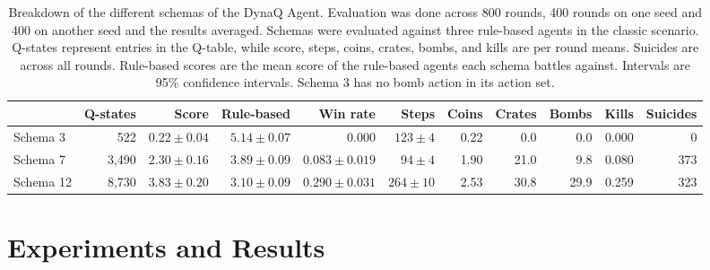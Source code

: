 \documentclass[article, 10pt]{IEEEtran}
\begin{document}
\begin{table}[t]
  \centering \small
  \caption{Breakdown of the different schemas of the DynaQ Agent. Evaluation was done across 800 rounds, 400 rounds on one seed and 400 on another seed and the results averaged. Schemas were evaluated against three rule-based agents in the classic scenario. Q-states represent entries in the Q-table, while score, steps, coins, crates, bombs, and kills are per round means. Suicides are across all rounds. Rule-based scores are the mean score of the rule-based agents each schema battles against. Intervals are 95\% confidence intervals. Schema 3 has no bomb action in its action set.}
  \label{tab:DynaQ Schema Comparison}
  \begin{tabular}{lrrrrrrrrrr}
    \toprule
    & Q-states & Score & Rule-based & Win rate & Steps & Coins & Crates & Bombs & Kills & Suicides \\
    \midrule
    Schema 3  & 522     & $0.22 \pm 0.04$ & $5.14 \pm 0.07$ & $0.000$           & $123 \pm 4$  & 0.22 & 0.0  & 0.0  & 0.000 & 0   \\
    Schema 7  & 3{,}490 & $2.30 \pm 0.16$ & $3.89 \pm 0.09$ & $0.083 \pm 0.019$ & $94 \pm 4$   & 1.90 & 21.0 & 9.8  & 0.080 & 373 \\
    Schema 12 & 8{,}730 & $3.83 \pm 0.20$ & $3.10 \pm 0.09$ & $0.290 \pm 0.031$ & $264 \pm 10$ & 2.53 & 30.8 & 29.9 & 0.259 & 323 \\
    \bottomrule
  \end{tabular}
\end{table}

\section{Experiments and Results}\label{sec:6_experimentsandresults}
\end{document}
